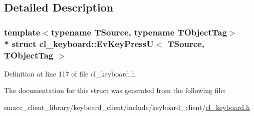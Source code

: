 \subsection{Detailed Description}
\subsubsection*{template$<$typename T\+Source, typename T\+Object\+Tag$>$\\*
struct cl\+\_\+keyboard\+::\+Ev\+Key\+Press\+U$<$ T\+Source, T\+Object\+Tag $>$}



Definition at line 117 of file cl\+\_\+keyboard.\+h.



The documentation for this struct was generated from the following file\+:\begin{DoxyCompactItemize}
\item 
smacc\+\_\+client\+\_\+library/keyboard\+\_\+client/include/keyboard\+\_\+client/\hyperlink{cl__keyboard_8h}{cl\+\_\+keyboard.\+h}\end{DoxyCompactItemize}
